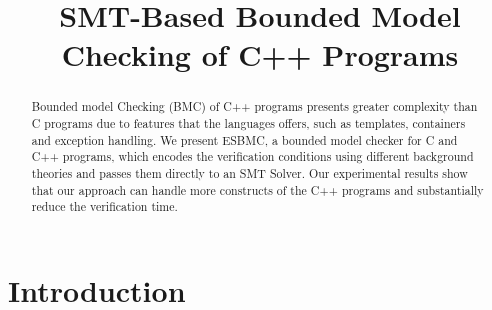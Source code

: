 \documentclass[a4paper]{llncs}
\newcommand{\comment}[1]{}
\begin{document}
\lstset{language=C,basicstyle=\small}
\lstset{numbers=left, numberstyle=\tiny, stepnumber=1, numbersep=5pt}
\lstset{tabsize=2}
\lstset{firstnumber=1}
\lstset{frame=single}


\title{SMT-Based Bounded Model Checking of C++ Programs}
\comment{
\author{Lucas Cordeiro$^1$ \and
	Jeremy Morse$^2$   \and
	Denis Nicole$^2$   \and
	Bernd Fischer$^2$}
\authorrunning{Lucas Cordeiro, Jeremy Morse, Denis Nicole, Bernd Fischer}
\institute{
  $^1$ Electronic and Information Research Center, %
  Federal University of Amazonas, Brazil\\
  $^2$ Electronics and Computer Science, %
  University of Southampton, UK\\
  \url{esbmc@ecs.soton.ac.uk}
}
}

\maketitle

\begin{abstract}
Bounded model Checking (BMC) of C++ programs presents greater complexity than C programs due to features that the languages offers, such as templates, containers and exception handling. We present ESBMC, a bounded model checker for C and C++ programs, which encodes the verification conditions using different background theories and passes them directly to an SMT Solver. Our experimental results show that our approach can handle more constructs of the C++ programs and substantially reduce the verification time. 
\end{abstract}

\section{Introduction}
%
\end{document}
